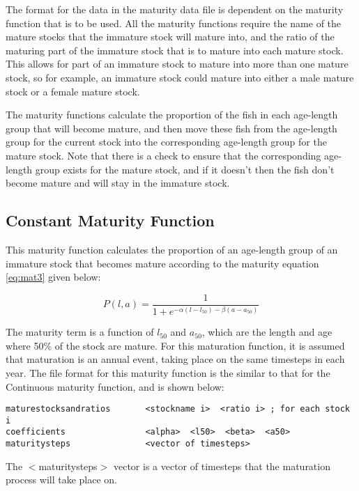 \documentclass[]{book}
\begin{document}
The format for the data in the maturity data file is dependent on the
maturity function that is to be used. All the maturity functions require
the name of the mature stocks that the immature stock will mature into,
and the ratio of the maturing part of the immature stock that is to
mature into each mature stock. This allows for part of an immature stock
to mature into more than one mature stock, so for example, an immature
stock could mature into either a male mature stock or a female mature
stock.

The maturity functions calculate the proportion of the fish in each
age-length group that will become mature, and then move these fish from
the age-length group for the current stock into the corresponding
age-length group for the mature stock. Note that there is a check to
ensure that the corresponding age-length group exists for the mature
stock, and if it doesn't then the fish don't become mature and will stay
in the immature stock.

\hypertarget{constant-maturity-function}{%
\subsection{Constant Maturity Function}\label{constant-maturity-function}}

This maturity function calculates the proportion of an age-length group
of an immature stock that becomes mature according to the maturity
equation \eqref{eq:mat3} given below:

\begin{equation}
\label{eq:mat3}
P(l, a) = \frac{1}{ 1 + e^{-\alpha(l - l_{50}) -\beta(a - a_{50})}}\end{equation}

The maturity term is a function of \(l_{50}\) and \(a_{50}\), which are the
length and age where 50\% of the stock are mature. For this maturation
function, it is assumed that maturation is an annual event, taking place
on the same timesteps in each year. The file format for this maturity
function is the similar to that for the Continuous maturity function,
and is shown below:

\begin{verbatim}
maturestocksandratios       <stockname i>  <ratio i> ; for each stock i
coefficients                <alpha>  <l50>  <beta>  <a50>
maturitysteps               <vector of timesteps>
\end{verbatim}

The \(<\)maturitysteps\(>\) vector is a vector of timesteps that the
maturation process will take place on.
\end{document}
